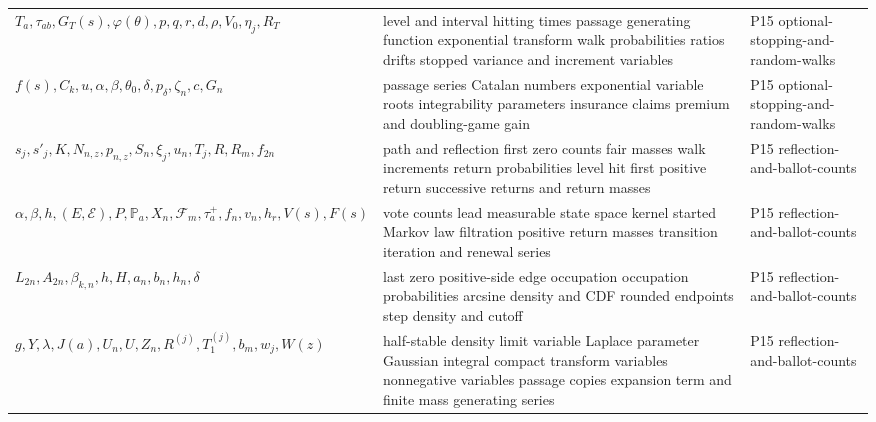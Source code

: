 \begin{longtable}{@{}p{}p{}p{}@{}}
\(T_a,\allowbreak \tau_{ab},\allowbreak G_T(s),\allowbreak \varphi(\theta),\allowbreak p,\allowbreak q,\allowbreak r,\allowbreak d,\allowbreak \rho,\allowbreak V_0,\allowbreak \eta_j,\allowbreak R_T\) & level and interval hitting times passage generating function exponential transform walk probabilities ratios drifts stopped variance and increment variables & P15 optional-\allowbreak{}stopping-\allowbreak{}and-\allowbreak{}random-\allowbreak{}walks \\
\(f(s),\allowbreak C_k,\allowbreak u,\allowbreak \alpha,\allowbreak \beta,\allowbreak \theta_0,\allowbreak \delta,\allowbreak p_\delta,\allowbreak \zeta_n,\allowbreak c,\allowbreak G_n\) & passage series Catalan numbers exponential variable roots integrability parameters insurance claims premium and doubling-game gain & P15 optional-\allowbreak{}stopping-\allowbreak{}and-\allowbreak{}random-\allowbreak{}walks \\
\(s_j,\allowbreak s'_j,\allowbreak K,\allowbreak N_{n,z},\allowbreak p_{n,z},\allowbreak S_n,\allowbreak \xi_j,\allowbreak u_n,\allowbreak T_j,\allowbreak R,\allowbreak R_m,\allowbreak f_{2n}\) & path and reflection first zero counts fair masses walk increments return probabilities level hit first positive return successive returns and return masses & P15 reflection-\allowbreak{}and-\allowbreak{}ballot-\allowbreak{}counts \\
\(\alpha,\allowbreak \beta,\allowbreak h,\allowbreak (E,\allowbreak \mathcal E),\allowbreak P,\allowbreak \mathbb P_a,\allowbreak X_n,\allowbreak \mathcal F_m,\allowbreak \tau_a^+,\allowbreak f_n,\allowbreak v_n,\allowbreak h_r,\allowbreak V(s),\allowbreak F(s)\) & vote counts lead measurable state space kernel started Markov law filtration positive return masses transition iteration and renewal series & P15 reflection-\allowbreak{}and-\allowbreak{}ballot-\allowbreak{}counts \\
\(L_{2n},\allowbreak A_{2n},\allowbreak \beta_{k,n},\allowbreak h,\allowbreak H,\allowbreak a_n,\allowbreak b_n,\allowbreak h_n,\allowbreak \delta\) & last zero positive-side edge occupation occupation probabilities arcsine density and CDF rounded endpoints step density and cutoff & P15 reflection-\allowbreak{}and-\allowbreak{}ballot-\allowbreak{}counts \\
\(g,\allowbreak Y,\allowbreak \lambda,\allowbreak J(a),\allowbreak U_n,\allowbreak U,\allowbreak Z_n,\allowbreak R^{(j)},\allowbreak T_1^{(j)},\allowbreak b_m,\allowbreak w_j,\allowbreak W(z)\) & half-stable density limit variable Laplace parameter Gaussian integral compact transform variables nonnegative variables passage copies expansion term and finite mass generating series & P15 reflection-\allowbreak{}and-\allowbreak{}ballot-\allowbreak{}counts \\

\end{longtable}
